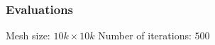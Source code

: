 \documentclass{beamer}
\begin{document}
\begin{frame}
\frametitle{Evaluations}
Mesh size: $10k \times 10k$
Number of iterations: $500$
\begin{columns}
\begin{column}{.5\textwidth}
\begin{center}
\end{center}
\end{column}
\begin{column}{.5\textwidth}
\begin{center}
\end{center}
\end{column}
\end{columns}
\end{frame}
\end{document}
